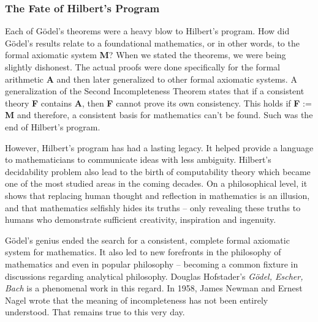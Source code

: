 \documentclass[a4paper, 12pt]{article}
\newcommand{\godels}{G\"{o}del's }
\theoremstyle{definition}
\begin{document}
    \subsubsection*{The Fate of Hilbert's Program}
    \vspace{-0.75 em}
    Each of \godels theorems were a heavy blow to Hilbert's program. How did \godels results relate to a foundational mathematics, or in other words, 
    to the formal axiomatic system \textbf{M}? When we stated the theorems, we were being slightly dishonest. The actual proofs 
    were done specifically for the formal arithmetic \textbf{A} and then later generalized to other formal axiomatic systems. 
    A generalization of the Second Incompleteness Theorem states that if a consistent theory \textbf{F} contains \textbf{A}, then 
    \textbf{F} cannot prove its own consistency. This holds if \textbf{F} := \textbf{M} and therefore, a consistent basis for mathematics can't be found. 
    Such was the end of Hilbert's program. 

    However, Hilbert's program has had a lasting legacy. It helped provide a language to mathematicians to communicate ideas 
    with less ambiguity. Hilbert's decidability problem also lead to the birth of computability theory which became 
    one of the most studied areas in the coming decades. On a philosophical level, it shows that replacing human thought and reflection in mathematics is an illusion, 
    and that mathematics selfishly hides its truths -- only revealing these truths to 
    humans who demonstrate sufficient creativity, inspiration and ingenuity. 
    
    \godels genius ended the search for a consistent, complete formal axiomatic system for mathematics. It also led to 
    new forefronts in the philosophy of mathematics and even in popular philosophy -- becoming a common fixture in discussions regarding 
    analytical philosophy. Douglas Hofstader's \textit{G\"{o}del, Escher, Bach} is a phenomenal work in this regard.  In 1958, James Newman and Ernest Nagel wrote that the meaning of incompleteness has not been entirely understood\cite{nagel_gos_2005}. That remains true to this very day. 

    
    
\end{document}
